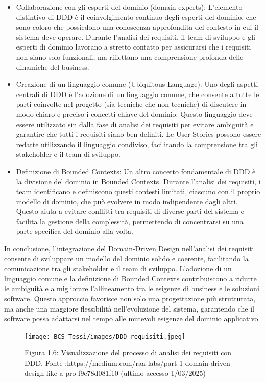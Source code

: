         \begin{itemize}
        \item Collaborazione con gli esperti del dominio (domain experts): L’elemento distintivo di DDD è il coinvolgimento continuo degli esperti del dominio, che sono coloro che possiedono una conoscenza approfondita del contesto in cui il sistema deve operare. Durante l'analisi dei requisiti, il team di sviluppo e gli esperti di dominio lavorano a stretto contatto per assicurarsi che i requisiti non siano solo funzionali, ma riflettano una comprensione profonda delle dinamiche del business.

        \item Creazione di un linguaggio comune (Ubiquitous Language): Uno degli aspetti centrali di DDD è l’adozione di un linguaggio comune, che consente a tutte le parti coinvolte nel progetto (sia tecniche che non tecniche) di discutere in modo chiaro e preciso i concetti chiave del dominio. Questo linguaggio deve essere utilizzato sin dalla fase di analisi dei requisiti per evitare ambiguità e garantire che tutti i requisiti siano ben definiti. Le User Stories possono essere redatte utilizzando il linguaggio condiviso, facilitando la comprensione tra gli stakeholder e il team di sviluppo.

        \item Definizione di Bounded Contexts: Un altro concetto fondamentale di DDD è la divisione del dominio in Bounded Contexts. Durante l'analisi dei requisiti, i team identificano e definiscono questi contesti limitati, ciascuno con il proprio modello di dominio, che può evolvere in modo indipendente dagli altri. Questo aiuta a evitare conflitti tra requisiti di diverse parti del sistema e facilita la gestione della complessità, permettendo di concentrarsi su una parte specifica del dominio alla volta.
        \end{itemize}

        In conclusione, l’integrazione del Domain-Driven Design nell’analisi dei requisiti consente di sviluppare un modello del dominio solido e coerente, facilitando la comunicazione tra gli stakeholder e il team di sviluppo. L’adozione di un linguaggio comune e la definizione di Bounded Contexts contribuiscono a ridurre le ambiguità e a migliorare l’allineamento tra le esigenze di business e le soluzioni software. Questo approccio favorisce non solo una progettazione più strutturata, ma anche una maggiore flessibilità nell’evoluzione del sistema, garantendo che il software possa adattarsi nel tempo alle mutevoli esigenze del dominio applicativo.
        \begin{figure} [H]
            \centering
            \texttt{[image: BCS-Tessi/images/DDD\_requisiti.jpeg]}
            \caption{Figura 1.6: Visualizzazione del processo di analisi dei requisiti con DDD. Fonte :https://medium.com/raa-labs/part-1-domain-driven-design-like-a-pro-f9e78d081f10 (ultimo accesso 1/03/2025)}
            \label{fig:enter-label}
        \end{figure}
        
